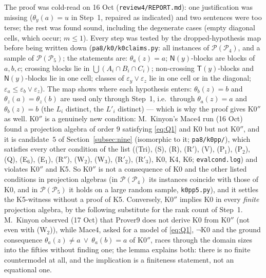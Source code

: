 \documentclass[11pt]{amsart}
\theoremstyle{definition}
\renewcommand{\P}{\mathcal{P}}
\newcommand{\T}{\mathsf{T}}
\newcommand{\N}{\mathsf{N}}
\begin{document}
The proof was cold-read on 16 Oct (\texttt{review4/REPORT.md}): one justification was missing ($\theta_y(a)=u$ in Step~1, repaired as indicated) and two sentences were too terse; the rest was found sound, including the degenerate cases (empty diagonal cells, which occur; $m\le1$). Every step was tested by the dropped-hypothesis map before being written down (\texttt{pa8/k0/k0claims.py}: all instances of $\P(\P_4)$, and a sample of $\P(\P_5)$; the statements are: $\theta_a(z)=a$; $\N(y)$-blocks are blocks of $a,b,c$; crossing blocks lie in $\bigcup(A_i\cap B_i\cap C_i)$; non-crossing $\T(y)$-blocks and $\N(y)$-blocks lie in one cell; classes of $\varepsilon_y\vee\varepsilon_z$ lie in one cell or in the diagonal; $\varepsilon_a\le\varepsilon_b\vee\varepsilon_z$). The map shows where each hypothesis enters: $\theta_b(z)=b$ and $\theta_z(a)=\theta_z(b)$ are used only through Step~1, i.e.\ through $\theta_a(z)=a$ and $\theta_b(z)=b$ (the $L_i$ distinct, the $L'_i$ distinct) --- which is why the proof gives K0$''$ as well. K0$''$ is a genuinely new condition: M.~Kinyon's Mace4 run (16 Oct) found a projection algebra of order $9$ satisfying \eqref{eq:Q1} and K0 but not K0$''$, and it is candidate~$5$ of Section~\ref{subsec:nine} (isomorphic to it; \texttt{pa8/k0pp/}), which satisfies every other condition of the list ((Tri), (S), (R), (R$'$), (V), (P$_1$), (P$_2$), (Q), (E$_6$), (E$_1$), (R$''$), (W$_2$), (W$_3$), (R$'_2$), (R$'_3$), K0, K4, K6; \texttt{evalcond.log}) and violates K0$''$ and K5. So K0$''$ is not a consequence of K0 and the other listed conditions in projection algebras (in $\P(\P_4)$ its instances coincide with those of K0, and in $\P(\P_5)$ it holds on a large random sample, \texttt{k0pp5.py}), and it settles the K5-witness without a proof of K5. Conversely, K0$''$ implies K0 in every \emph{finite} projection algebra, by the following substitute for the rank count of Step~1. M.~Kinyon observed (17 Oct) that Prover9 does not derive K0 from K0$''$ (not even with (W$_2$)), while Mace4, asked for a model of \eqref{eq:Q1}, $\neg$K0 and the ground consequence $\theta_a(z)\ne a\ \vee\ \theta_a(b)=a$ of K0$''$, races through the domain sizes into the fifties without finding one; the lemma explains both: there is no finite countermodel at all, and the implication is a finiteness statement, not an equational one.
\end{document}
